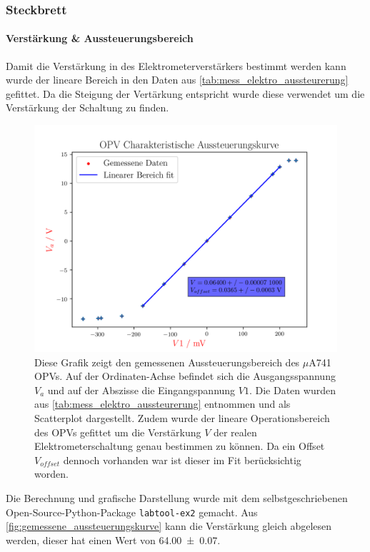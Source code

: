 \documentclass[12pt,english,ngerman]{scrartcl}
\begin{document}
\subsubsection{Steckbrett}
\paragraph{Verstärkung \& Aussteuerungsbereich}
Damit die Verstärkung in des Elektrometerverstärkers bestimmt werden kann wurde
der lineare Bereich in den Daten aus \autoref{tab:mess_elektro_aussteurerung}
gefittet. Da die Steigung der Vertärkung entspricht wurde diese verwendet  um
die Verstärkung der Schaltung zu finden.

\begin{figure}[H]
  \centering
    \includegraphics[width=\linewidth]{./Output/OPV/opvmessung.png}
    \caption{Diese Grafik zeigt den gemessenen Aussteuerungsbereich des
    $\mu$A741 OPVs. Auf der Ordinaten-Achse befindet sich die Ausgangsspannung
    $V_a$ und auf der Abszisse die Eingangspannung $V1$. Die Daten wurden aus
    \autoref{tab:mess_elektro_aussteurerung} entnommen und als Scatterplot
    dargestellt. Zudem wurde der lineare Operationsbereich des OPVs gefittet um
  die Verstärkung $V$ der realen Elektrometerschaltung genau bestimmen zu
können. Da ein Offset $V_{offset}$ dennoch vorhanden war ist dieser im Fit
berücksichtig worden.}
  \label{fig:gemessene_aussteuerungskurve}
\end{figure}

Die Berechnung und grafische Darstellung wurde mit dem selbstgeschriebenen
Open-Source-Python-Package \texttt{labtool-ex2}\cite{labtool} gemacht. Aus
\autoref{fig:gemessene_aussteuerungskurve} kann die Verstärkung gleich
abgelesen werden, dieser hat einen Wert von \num{64.00(7)}.
\end{document}
